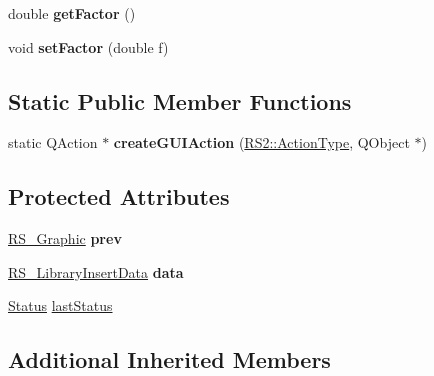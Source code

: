 \begin{DoxyCompactItemize}
\item 
\hypertarget{classRS__ActionLibraryInsert_aa08a5a3230f64444c8940caf07208885}{double {\bfseries get\-Factor} ()}\label{classRS__ActionLibraryInsert_aa08a5a3230f64444c8940caf07208885}

\item 
\hypertarget{classRS__ActionLibraryInsert_a20cf095ddddc2aa32f365503fe6b0dd1}{void {\bfseries set\-Factor} (double f)}\label{classRS__ActionLibraryInsert_a20cf095ddddc2aa32f365503fe6b0dd1}

\end{DoxyCompactItemize}
\subsection*{Static Public Member Functions}
\begin{DoxyCompactItemize}
\item 
\hypertarget{classRS__ActionLibraryInsert_a3518c8c078d27a33f62eb983cabfbdd8}{static Q\-Action $\ast$ {\bfseries create\-G\-U\-I\-Action} (\hyperlink{classRS2_afe3523e0bc41fd637b892321cfc4b9d7}{R\-S2\-::\-Action\-Type}, Q\-Object $\ast$)}\label{classRS__ActionLibraryInsert_a3518c8c078d27a33f62eb983cabfbdd8}

\end{DoxyCompactItemize}
\subsection*{Protected Attributes}
\begin{DoxyCompactItemize}
\item 
\hypertarget{classRS__ActionLibraryInsert_aac799d782c54a1771cda3d8eed0be86b}{\hyperlink{classRS__Graphic}{R\-S\-\_\-\-Graphic} {\bfseries prev}}\label{classRS__ActionLibraryInsert_aac799d782c54a1771cda3d8eed0be86b}

\item 
\hypertarget{classRS__ActionLibraryInsert_a52e8ceabdd76f015176946c7811ebb41}{\hyperlink{structRS__LibraryInsertData}{R\-S\-\_\-\-Library\-Insert\-Data} {\bfseries data}}\label{classRS__ActionLibraryInsert_a52e8ceabdd76f015176946c7811ebb41}

\item 
\hyperlink{classRS__ActionLibraryInsert_a07bcc0d56f8cbdad359606f8af309ae7}{Status} \hyperlink{classRS__ActionLibraryInsert_aec521c5d1450043a047f16ac85ff65c7}{last\-Status}
\end{DoxyCompactItemize}
\subsection*{Additional Inherited Members}


